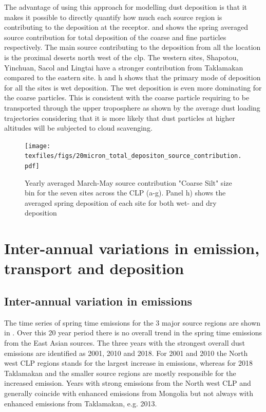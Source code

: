 The advantage of using this approach for modelling dust deposition is that it makes it possible to directly quantify how much each source region is contributing to the deposition at the receptor.   
 and  shows the spring averaged source contribution for total deposition of the coarse and fine particles respectively. The main source contributing to the deposition from all the location is the proximal deserts north west of the \acrshort{clp}.  The western sites, Shapotou, Yinchuan, Sacol and Lingtai have a stronger contribution from Taklamakan compared to the eastern site. h and h shows that the primary mode of deposition for all the sites is wet deposition. The wet deposition is even more dominating for the coarse particles. This is consistent with the coarse particle requiring to be transported through the upper troposphere as shown by the average dust loading trajectories considering that it is more likely that dust particles at higher altitudes will be subjected to cloud scavenging.     
 \begin{figure}[htbp]
    \centering
    \texttt{[image: texfiles/figs/20micron\_total\_depositon\_source\_contribution.pdf]}
    \caption{Yearly averaged March-May source contribution "Coarse Silt" size bin for the seven sites across the CLP (a-g). Panel h) shows the averaged spring deposition of each site for both wet- and dry deposition}
    \label{fig:source_contrib_20mmu}
\end{figure}

\section{Inter-annual variations in emission, transport and deposition}\label{sec:inter_annual_results}

\subsection{Inter-annual variation in emissions}
The time series of spring time emissions for the 3 major source regions are shown in . Over this 20 year period there is no overall trend in the spring time emissions from the East Asian sources. The three years with the strongest overall dust emissions are identified as 2001, 2010 and 2018. For 2001 and 2010 the North west CLP regions stands for the largest increase in emissions, whereas for 2018 Taklamakan and the smaller source regions are mostly responsible for the increased emission. Years with strong emissions from the North west CLP and generally coincide with enhanced emissions from Mongolia but not always with enhanced emissions from Taklamakan, e.g. 2013.   

